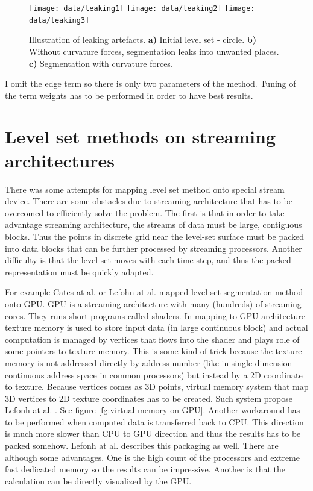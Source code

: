 \begin{figure}
    \centering
    \texttt{[image: data/leaking1]}
    \texttt{[image: data/leaking2]}
    \texttt{[image: data/leaking3]}
    \caption[Leaking]{Illustration of leaking artefacts.
    \textbf{a)} Initial level set - circle.
    \textbf{b)} Without curvature forces, segmentation leaks into unwanted places.
    \textbf{c)} Segmentation with curvature forces.
}
    \label{fg:leaking}
\end{figure}

I omit the edge term so there is only two parameters of the method.
Tuning of the term weights has to be performed in order to have best results.

\section{Level set methods on streaming architectures}

\par
There was some attempts for mapping level set method onto special stream device.
There are some obstacles due to streaming architecture that has to be overcomed to efficiently solve the problem.
The first is that in order to take advantage streaming architecture, the streams of data must be large, contiguous blocks.
Thus the points in discrete grid near the level-set surface must be packed into data blocks that can be further processed by streaming processors.
Another difficulty is that the level set moves with each time step, and thus the packed representation must be quickly adapted.

\par
For example Cates at al. \cite{GIST} or Lefohn at al. \cite{lefonhGPUSolver} mapped level set segmentation method onto GPU.
GPU is a streaming architecture with many (hundreds) of streaming cores. They runs short programs called shaders.
In mapping to GPU architecture texture memory is used to store input data (in large continuous block) and actual computation is managed by vertices that flows into the shader and plays role of some pointers to texture memory.
This is some kind of trick because the texture memory is not addressed directly by address number (like in single dimension continuous address space in common processors) but instead by a 2D coordinate to texture.
Because vertices comes as 3D points, virtual memory system that map 3D vertices to 2D texture coordinates has to be created.
Such system propose Lefonh at al. \cite{lefonhGPUSolver}. See figure \ref{fg:virtual memory on GPU}.
Another workaround has to be performed when computed data is transferred back to CPU.
This direction is much more slower than CPU to GPU direction and thus the results has to be packed somehow.
Lefonh at al. \cite{lefonhGPUSolver} describes this packaging as well.
There are although some advantages.
One is the high count of the processors and extreme fast dedicated memory so the results can be impressive.
Another is that the calculation can be directly visualized by the GPU.

